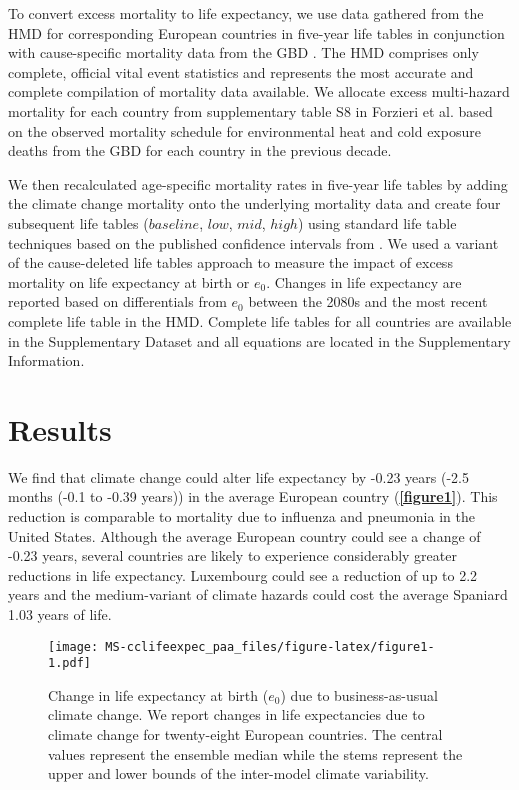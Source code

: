 \documentclass[12pt,]{article}
\makeatletter
\def\maxwidth{\ifdim\Gin@nat@width>\linewidth\linewidth
\else\Gin@nat@width\fi}
\let\Oldincludegraphics\includegraphics
\renewcommand{\includegraphics}[1]{\Oldincludegraphics[width=\maxwidth]{#1}}
\makeatother
\begin{document}
To convert excess mortality to life expectancy, we use data gathered
from the HMD \citep{HMD} for corresponding European countries in
five-year life tables in conjunction with cause-specific mortality data
from the GBD \citep{GBD, wang2012age}. The HMD comprises only complete,
official vital event statistics and represents the most accurate and
complete compilation of mortality data available. We allocate excess
multi-hazard mortality for each country from supplementary table S8 in
Forzieri et al. \citep{forzieri2017increasing} based on the observed
mortality schedule for environmental heat and cold exposure deaths from
the GBD for each country in the previous decade.

We then recalculated age-specific mortality rates in five-year life
tables by adding the climate change mortality onto the underlying
mortality data and create four subsequent life tables (\(baseline\),
\(low\), \(mid\), \(high\)) using standard life table techniques
\citep{wunsch2013life} based on the published confidence intervals from
\citep{forzieri2017increasing}. We used a variant of the cause-deleted
life tables approach
\citep{brand2005approximations, beltran2008integrated} to measure the
impact of excess mortality on life expectancy at birth or \(e_0\).
Changes in life expectancy are reported based on differentials from
\(e_0\) between the 2080s and the most recent complete life table in the
HMD. Complete life tables for all countries are available in the
Supplementary Dataset and all equations are located in the Supplementary
Information.

\section{Results}\label{results}

We find that climate change could alter life expectancy by -0.23 years
(-2.5 months (-0.1 to -0.39 years)) in the average European country
(\textbf{\autoref{figure1}}). This reduction is comparable to mortality
due to influenza and pneumonia \citep{arias2013united} in the United
States. Although the average European country could see a change of
-0.23 years, several countries are likely to experience considerably
greater reductions in life expectancy. Luxembourg could see a reduction
of up to 2.2 years and the medium-variant of climate hazards could cost
the average Spaniard 1.03 years of life.

\begin{figure}
\centering
\texttt{[image: MS-cclifeexpec\_paa\_files/figure-latex/figure1-1.pdf]}
\caption{Change in life expectancy at birth (\(e_0\)) due to
business-as-usual climate change. We report changes in life expectancies
due to climate change for twenty-eight European countries. The central
values represent the ensemble median while the stems represent the upper
and lower bounds of the inter-model climate variability.\label{figure1}}
\end{figure}
\end{document}
